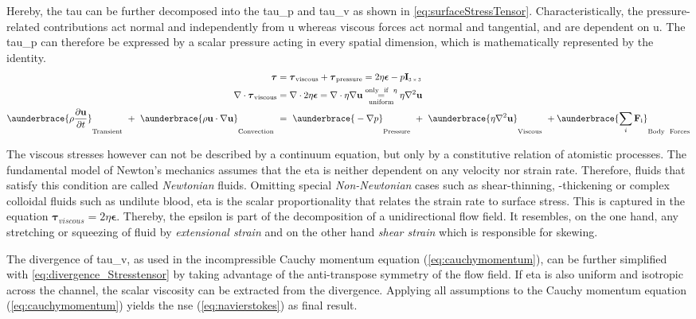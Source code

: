 Hereby, the \gls{tau} can be further decomposed into the \gls{tau_p} and \gls{tau_v} as shown in \cref{eq:surfaceStressTensor}. Characteristically, the pressure-related contributions act normal and independently from \gls{u} whereas viscous forces act normal and tangential, and are dependent on \gls{u}. The \gls{tau_p} can therefore be expressed by a scalar pressure acting in every spatial dimension, which is mathematically represented by the identity. 
\begin{align}
	\boldsymbol{\tau} &= \boldsymbol{\tau}_\text{viscous} +  \boldsymbol{\tau}_\text{pressure} = 2\eta \boldsymbol{\epsilon} - p \mathbf{I}_\text{\scaleto{3 \times 3}{4pt}} \label{eq:surfaceStressTensor}\\
	\nabla \cdot \boldsymbol{\tau}_\text{viscous} &= \nabla \cdot 2\eta \boldsymbol{\epsilon} = \nabla \cdot \eta \nabla \mathbf{u} \underset{\text{uniform}}{\overset{\text{only \ if \ }\eta}{=}} \eta \nabla^2 \mathbf{u} 	\label{eq:divergence_Stresstensor} \\
	\aunderbrace{\vphantom{\sum_{i}} \rho \frac{\partial \mathbf{u}}{\partial t}}_{\text{Transient}}\ +\ \aunderbrace{\vphantom{\sum_{i}}\rho\mathbf{u} \cdot \nabla \mathbf{u}}_{\text{Convection}}\ &=\ \aunderbrace{\vphantom{\sum_{i}}-\nabla p}_{\text{Pressure}}\ +\ \aunderbrace{\vphantom{\sum_{i}}\eta \nabla^2 \mathbf{u}}_{\text{Viscous}}\ + \aunderbrace{\sum_{i}\mathbf{F}_\text{i}}_{\text{Body \ Forces}} \label{eq:navierstokes}
\end{align}

The viscous stresses however can not be described by a continuum equation, but only by a constitutive relation of atomistic processes. The fundamental model of Newton's mechanics assumes that the \gls{eta} is neither dependent on any velocity nor strain rate. Therefore, fluids that satisfy this condition are called \textit{Newtonian} fluids. Omitting special \textit{Non-Newtonian} cases such as shear-thinning, -thickening or complex colloidal fluids such as undilute blood, \gls{eta} is the scalar proportionality that relates the strain rate to surface stress.\cite{lit:fluidic:kirby} This is captured in the equation $\boldsymbol{\tau}_{viscous} = 2\eta \mathbf{\epsilon} $. Thereby, the \gls{epsilon} is part of the decomposition of a unidirectional flow field. It resembles, on the one hand, any stretching or squeezing of fluid by \textit{extensional strain} and on the other hand \textit{shear strain} which is responsible for skewing.\cite{lit:fluidic:kirby}

The divergence of \gls{tau_v}, as used in the incompressible Cauchy momentum equation (\cref{eq:cauchymomentum}), can be further simplified with \cref{eq:divergence_Stresstensor} by taking advantage of the anti-transpose symmetry of the flow field.\cite{lit:fluidic:kirby} If \gls{eta} is also uniform and isotropic across the channel, the scalar viscosity can be extracted from the divergence.  Applying all assumptions to the Cauchy momentum equation (\cref{eq:cauchymomentum}) yields the \gls{nse} (\cref{eq:navierstokes}) as final result. 

